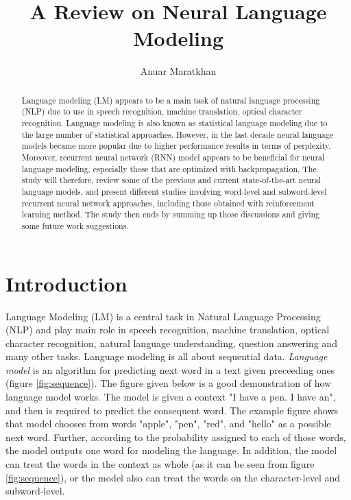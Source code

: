 \documentclass{IEEEtran}
\title{A Review on Neural Language Modeling}
\author{Anuar Maratkhan}
\affil{School of Science and Technology\\Nazarbayev University\\anuar.maratkhan@nu.edu.kz}
\begin{document}
\maketitle

\begin{abstract}
Language modeling (LM) appears to be a main task of natural language processing (NLP) due to use in speech recognition, machine translation, optical character recognition. Language modeling is also known as statistical language modeling due to the large number of statistical approaches. However, in the last decade neural language models became more popular due to higher performance results in terms of perplexity. Moreover, recurrent neural network (RNN) model appears to be beneficial for neural language modeling, especially those that are optimized with backpropagation. The study will therefore, review some of the previous and current state-of-the-art neural language models, and present different studies involving word-level and subword-level recurrent neural network approaches, including those obtained with reinforcement learning method. The study then ends by summing up those discussions and giving some future work suggestions.
\end{abstract}

\section{Introduction}

Language Modeling (LM) is a central task in Natural Language Processing (NLP) and play main role in speech recognition, machine translation, optical character recognition, natural language understanding, question answering and many other tasks. Language modeling is all about sequential data. \textit{Language model} is an algorithm for predicting next word in a text given preceeding ones (figure \ref{fig:sequence}). The figure given below is a good demonstration of how language model works. The model is given a context "I have a pen. I have an", and then is required to predict the consequent word. The example figure shows that model chooses from words "apple", "pen", "red", and "hello" as a possible next word. Further, according to the probability assigned to each of those words, the model outputs one word for modeling the language. In addition, the model can treat the words in the context as whole (as it can be seen from figure \ref{fig:sequence}), or the model also can treat the words on the character-level and subword-level.
\end{document}
